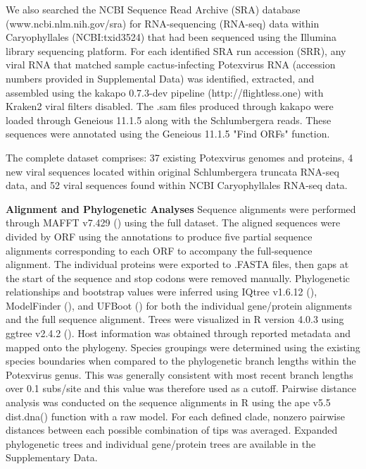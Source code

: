 \documentclass{article}
\begin{document}
We also searched the NCBI Sequence Read Archive (SRA) database (www.ncbi.nlm.nih.gov/sra) for RNA-sequencing (RNA-seq) data within Caryophyllales (NCBI:txid3524) that had been sequenced using the Illumina library sequencing platform. 
For each identified SRA run accession (SRR), any viral RNA that matched sample cactus-infecting Potexvirus RNA (accession numbers provided in Supplemental Data) was identified, extracted, and assembled using the kakapo 0.7.3-dev pipeline (http://flightless.one) with Kraken2 viral filters disabled. 
The .sam files produced through kakapo were loaded through Geneious 11.1.5 along with the Schlumbergera reads.
These sequences were annotated using the Geneious 11.1.5 "Find ORFs" function. 

The complete dataset comprises: 37 existing Potexvirus genomes and proteins, 4 new viral sequences located within original Schlumbergera truncata RNA-seq data, and 52 viral sequences found within NCBI Caryophyllales RNA-seq data.

\textbf{Alignment and Phylogenetic Analyses}
Sequence alignments were performed through MAFFT v7.429 (\cite{katoh_mafft_2002}) using the full dataset.
The aligned sequences were divided by ORF using the annotations to produce five partial sequence alignments corresponding to each ORF to accompany the full-sequence alignment. 
The individual proteins were exported to .FASTA files, then gaps at the start of the sequence and stop codons were removed manually. 
Phylogenetic relationships and bootstrap values were inferred using IQtree v1.6.12 (\cite{nguyen_iq-tree_2015}), ModelFinder (\cite{kalyaanamoorthy_modelfinder_2017}), and UFBoot (\cite{hoang_ufboot2_2018}) for both the individual gene/protein alignments and the full sequence alignment. 
Trees were visualized in R version 4.0.3 using ggtree v2.4.2 (\cite{yu_span_2017}). 
Host information was obtained through reported metadata and mapped onto the phylogeny. 
Species groupings were determined using the existing species boundaries when compared to the phylogenetic branch lengths within the Potexvirus genus. 
This was generally consistent with most recent branch lengths over 0.1 subs/site and this value was therefore used as a cutoff. 
Pairwise distance analysis was conducted on the sequence alignments in R using the ape v5.5  dist.dna() function with a raw model. 
For each defined clade, nonzero pairwise distances between each possible combination of tips was averaged. 
Expanded phylogenetic trees and individual gene/protein trees are available in the Supplementary Data.
\end{document}
